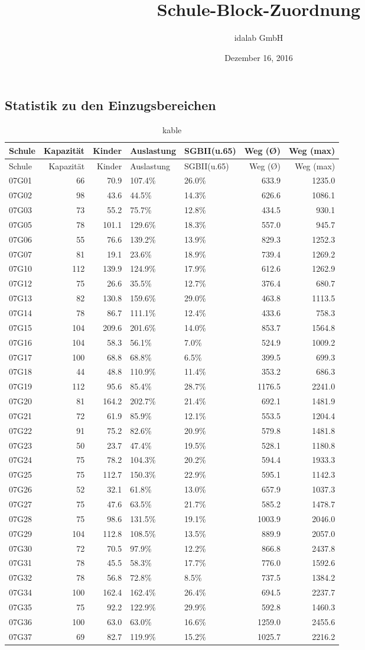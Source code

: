 \documentclass[a4paper]{article}
\title{Schule-Block-Zuordnung}
\author{idalab GmbH}
\date{Dezember 16, 2016}
\begin{document}
\maketitle

\subsection{Statistik zu den
Einzugsbereichen}\label{statistik-zu-den-einzugsbereichen}

\begin{longtable}[]{@{}lrrllrr@{}}
\caption{kable}\tabularnewline
\toprule
Schule & Kapazität & Kinder & Auslastung & SGBII(u.65) & Weg (Ø) & Weg
(max)\tabularnewline
\midrule
\endfirsthead
\toprule
Schule & Kapazität & Kinder & Auslastung & SGBII(u.65) & Weg (Ø) & Weg
(max)\tabularnewline
\midrule
\endhead
07G01 & 66 & 70.9 & 107.4\% & 26.0\% & 633.9 & 1235.0\tabularnewline
07G02 & 98 & 43.6 & 44.5\% & 14.3\% & 626.6 & 1086.1\tabularnewline
07G03 & 73 & 55.2 & 75.7\% & 12.8\% & 434.5 & 930.1\tabularnewline
07G05 & 78 & 101.1 & 129.6\% & 18.3\% & 557.0 & 945.7\tabularnewline
07G06 & 55 & 76.6 & 139.2\% & 13.9\% & 829.3 & 1252.3\tabularnewline
07G07 & 81 & 19.1 & 23.6\% & 18.9\% & 739.4 & 1269.2\tabularnewline
07G10 & 112 & 139.9 & 124.9\% & 17.9\% & 612.6 & 1262.9\tabularnewline
07G12 & 75 & 26.6 & 35.5\% & 12.7\% & 376.4 & 680.7\tabularnewline
07G13 & 82 & 130.8 & 159.6\% & 29.0\% & 463.8 & 1113.5\tabularnewline
07G14 & 78 & 86.7 & 111.1\% & 12.4\% & 433.6 & 758.3\tabularnewline
07G15 & 104 & 209.6 & 201.6\% & 14.0\% & 853.7 & 1564.8\tabularnewline
07G16 & 104 & 58.3 & 56.1\% & 7.0\% & 524.9 & 1009.2\tabularnewline
07G17 & 100 & 68.8 & 68.8\% & 6.5\% & 399.5 & 699.3\tabularnewline
07G18 & 44 & 48.8 & 110.9\% & 11.4\% & 353.2 & 686.3\tabularnewline
07G19 & 112 & 95.6 & 85.4\% & 28.7\% & 1176.5 & 2241.0\tabularnewline
07G20 & 81 & 164.2 & 202.7\% & 21.4\% & 692.1 & 1481.9\tabularnewline
07G21 & 72 & 61.9 & 85.9\% & 12.1\% & 553.5 & 1204.4\tabularnewline
07G22 & 91 & 75.2 & 82.6\% & 20.9\% & 579.8 & 1481.8\tabularnewline
07G23 & 50 & 23.7 & 47.4\% & 19.5\% & 528.1 & 1180.8\tabularnewline
07G24 & 75 & 78.2 & 104.3\% & 20.2\% & 594.4 & 1933.3\tabularnewline
07G25 & 75 & 112.7 & 150.3\% & 22.9\% & 595.1 & 1142.3\tabularnewline
07G26 & 52 & 32.1 & 61.8\% & 13.0\% & 657.9 & 1037.3\tabularnewline
07G27 & 75 & 47.6 & 63.5\% & 21.7\% & 585.2 & 1478.7\tabularnewline
07G28 & 75 & 98.6 & 131.5\% & 19.1\% & 1003.9 & 2046.0\tabularnewline
07G29 & 104 & 112.8 & 108.5\% & 13.5\% & 889.9 & 2057.0\tabularnewline
07G30 & 72 & 70.5 & 97.9\% & 12.2\% & 866.8 & 2437.8\tabularnewline
07G31 & 78 & 45.5 & 58.3\% & 17.7\% & 776.0 & 1592.6\tabularnewline
07G32 & 78 & 56.8 & 72.8\% & 8.5\% & 737.5 & 1384.2\tabularnewline
07G34 & 100 & 162.4 & 162.4\% & 26.4\% & 694.5 & 2237.7\tabularnewline
07G35 & 75 & 92.2 & 122.9\% & 29.9\% & 592.8 & 1460.3\tabularnewline
07G36 & 100 & 63.0 & 63.0\% & 16.6\% & 1259.0 & 2455.6\tabularnewline
07G37 & 69 & 82.7 & 119.9\% & 15.2\% & 1025.7 & 2216.2\tabularnewline
\bottomrule
\end{longtable}
\end{document}
